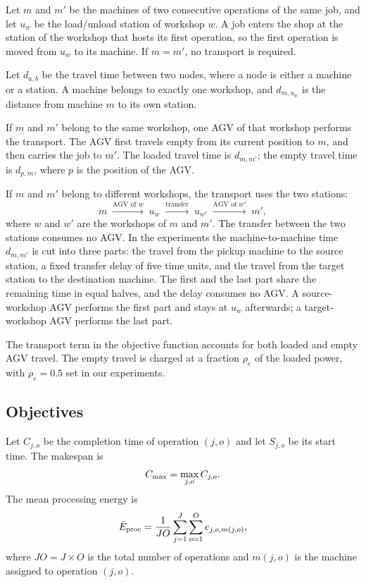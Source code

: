Let $m$ and $m'$ be the machines of two consecutive operations of the same
job, and let $u_w$ be the load/unload station of workshop $w$. A job enters
the shop at the station of the workshop that hosts its first operation, so
the first operation is moved from $u_w$ to its machine. If $m=m'$, no
transport is required.

Let $d_{a,b}$ be the travel time between two nodes, where a node is either a
machine or a station. A machine belongs to exactly one workshop, and
$d_{m,u_w}$ is the distance from machine $m$ to its own station.

If $m$ and $m'$ belong to the same workshop, one AGV of that workshop
performs the transport. The AGV first travels empty from its current position
to $m$, and then carries the job to $m'$. The loaded travel time is
$d_{m,m'}$; the empty travel time is $d_{p,m}$, where $p$ is the position of
the AGV.

If $m$ and $m'$ belong to different workshops, the transport uses the two
stations:
\begin{equation}
m \;\xrightarrow{\text{AGV of }w}\; u_{w}
\;\xrightarrow{\text{transfer}}\; u_{w'}
\;\xrightarrow{\text{AGV of }w'}\; m',
\label{eq:split}
\end{equation}
where $w$ and $w'$ are the workshops of $m$ and $m'$. The transfer between
the two stations consumes no AGV. In the experiments the machine-to-machine
time $d_{m,m'}$ is cut into three parts: the travel from the pickup machine to
the source station, a fixed transfer delay of five time units, and the travel
from the target station to the destination machine. The first and the last
part share the remaining time in equal halves, and the delay consumes no AGV. A
source-workshop AGV performs the first part and stays at $u_w$ afterwards; a
target-workshop AGV performs the last part.

The transport term in the objective function accounts for both loaded and empty AGV travel. 
The empty travel is charged at a fraction $\rho_e$ of the loaded power, with $\rho_e=0.5$ set in our experiments.

\subsection{Objectives}

Let $C_{j,o}$ be the completion time of operation $(j,o)$ and let $S_{j,o}$
be its start time. The makespan is
\begin{equation}
C_{\max}=\max_{j,o} C_{j,o}.
\end{equation}
The mean processing energy is
\begin{equation}
\bar{E}_{\mathrm{proc}}=\frac{1}{JO}\sum_{j=1}^{J}\sum_{o=1}^{O} e_{j,o,m(j,o)},
\end{equation}
where $JO=J\times O$ is the total number of operations and $m(j,o)$ is the
machine assigned to operation $(j,o)$.

